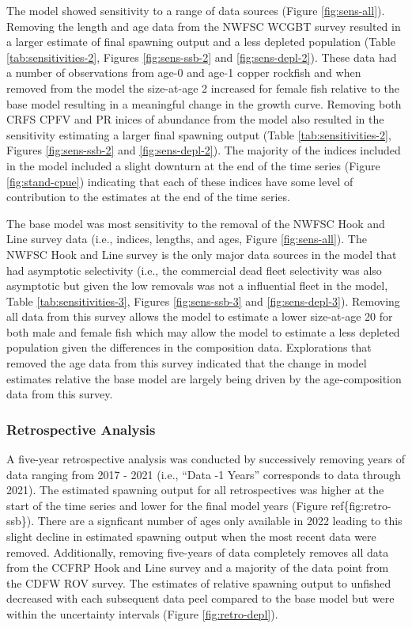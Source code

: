 \documentclass[11pt,
  english,
  letterpaper,
]{article}
\begin{document}
The model showed sensitivity to a range of data sources (Figure \ref{fig:sens-all}). Removing the length and age data from the NWFSC WCGBT survey resulted in a larger estimate of final spawning output and a less depleted population (Table \ref{tab:sensitivities-2}, Figures \ref{fig:sens-ssb-2} and \ref{fig:sens-depl-2}). These data had a number of observations from age-0 and age-1 copper rockfish and when removed from the model the size-at-age 2 increased for female fish relative to the base model resulting in a meaningful change in the growth curve. Removing both CRFS CPFV and PR inices of abundance from the model also resulted in the sensitivity estimating a larger final spawning output (Table \ref{tab:sensitivities-2}, Figures \ref{fig:sens-ssb-2} and \ref{fig:sens-depl-2}). The majority of the indices included in the model included a slight downturn at the end of the time series (Figure \ref{fig:stand-cpue}) indicating that each of these indices have some level of contribution to the estimates at the end of the time series.

The base model was most sensitivity to the removal of the NWFSC Hook and Line survey data (i.e., indices, lengths, and ages, Figure \ref{fig:sens-all}). The NWFSC Hook and Line survey is the only major data sources in the model that had asymptotic selectivity (i.e., the commercial dead fleet selectivity was also asymptotic but given the low removals was not a influential fleet in the model, Table \ref{tab:sensitivities-3}, Figures \ref{fig:sens-ssb-3} and \ref{fig:sens-depl-3}). Removing all data from this survey allows the model to estimate a lower size-at-age 20 for both male and female fish which may allow the model to estimate a less depleted population given the differences in the composition data. Explorations that removed the age data from this survey indicated that the change in model estimates relative the base model are largely being driven by the age-composition data from this survey.

\hypertarget{retrospective-analysis}{%
\subsubsection{Retrospective Analysis}\label{retrospective-analysis}}

A five-year retrospective analysis was conducted by successively removing years of data ranging from 2017 - 2021 (i.e., ``Data -1 Years'' corresponds to data through 2021). The estimated spawning output for all retrospectives was higher at the start of the time series and lower for the final model years (Figure ref\{fig:retro-ssb\}). There are a signficant number of ages only available in 2022 leading to this slight decline in estimated spawning output when the most recent data were removed. Additionally, removing five-years of data completely removes all data from the CCFRP Hook and Line survey and a majority of the data point from the CDFW ROV survey. The estimates of relative spawning output to unfished decreased with each subsequent data peel compared to the base model but were within the uncertainty intervals (Figure \ref{fig:retro-depl}).
\end{document}
